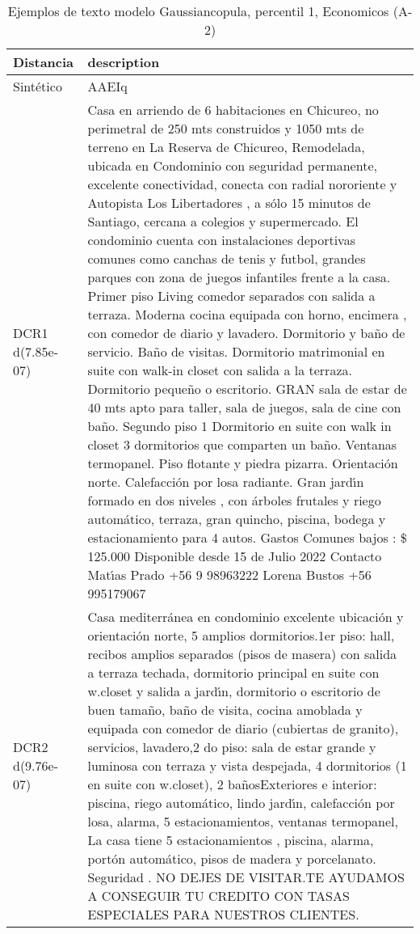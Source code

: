 \begin{table}[H]
\centering
\fontsize{10}{14}\selectfont
\caption{Ejemplos de texto modelo Gaussiancopula, percentil 1, Economicos (A-2)}
\label{table-example-economicos-a-2-gaussiancopula-1p-text}
\begin{tabular}{|l|m{35em}|}
\hline
\rowcolor[gray]{0.8}
Distancia & description \\
\hline Sintético & AAEIq \\
\hline DCR1 d(7.85e-07) & Casa en arriendo de 6 habitaciones en Chicureo, no perimetral de 250 mts construidos y 1050 mts de terreno en La Reserva de Chicureo, Remodelada, ubicada en Condominio con seguridad permanente, excelente conectividad, conecta con radial nororiente y Autopista Los Libertadores , a s\'olo 15 minutos de Santiago, cercana a colegios y supermercado. El condominio cuenta con instalaciones deportivas comunes como canchas de tenis y futbol, grandes parques con zona de juegos infantiles frente a la casa.
  Primer piso Living comedor separados con salida a terraza. Moderna cocina equipada con horno, encimera , con comedor de diario y lavadero. Dormitorio y ba\~no de servicio. Ba\~no de visitas. Dormitorio matrimonial en suite con walk-in closet con salida a la terraza. Dormitorio peque\~no o escritorio. GRAN sala de estar de 40 mts apto para taller, sala de juegos, sala de cine con ba\~no.  Segundo piso 1 Dormitorio en suite con walk  in closet 3 dormitorios que comparten un ba\~no.  Ventanas termopanel. Piso flotante y piedra pizarra. Orientaci\'on norte. Calefacci\'on por losa radiante. Gran jard{\'\i}n formado en dos niveles , con \'arboles frutales y riego autom\'atico, terraza, gran quincho, piscina, bodega y estacionamiento para 4 autos. Gastos Comunes bajos : \$ 125.000 Disponible desde 15 de Julio 2022 Contacto  Mat{\'\i}as Prado +56 9 98963222 Lorena Bustos +56 995179067 \\
\hline DCR2 d(9.76e-07) & Casa mediterr\'anea en condominio excelente ubicaci\'on y orientaci\'on norte, 5 amplios dormitorios.1er piso: hall, recibos amplios separados (pisos de masera) con salida a terraza techada, dormitorio principal en suite con w.closet y salida a jard{\'\i}n, dormitorio o escritorio de buen tama\~no, ba\~no de visita, cocina amoblada y equipada con comedor de diario (cubiertas de granito), servicios, lavadero,2 do piso: sala de estar grande y luminosa con terraza y vista despejada, 4 dormitorios (1 en suite con w.closet), 2 ba\~nosExteriores e interior: piscina, riego autom\'atico, lindo jard{\'\i}n, calefacci\'on por losa, alarma, 5 estacionamientos, ventanas termopanel, La casa tiene 5 estacionamientos , piscina, alarma, port\'on autom\'atico, pisos de madera y porcelanato. Seguridad . NO DEJES DE VISITAR.TE AYUDAMOS A CONSEGUIR TU CREDITO CON TASAS ESPECIALES PARA NUESTROS CLIENTES. \\
\hline
\end{tabular}
\end{table}
